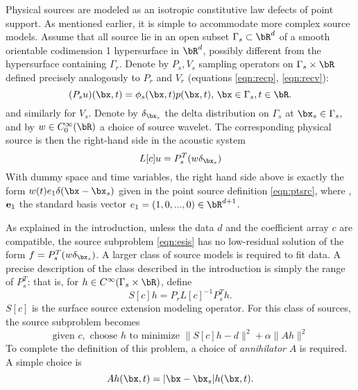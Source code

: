 Physical sources are modeled as an isotropic constitutive law defects of point support. As mentioned earlier, it is simple to accommodate more complex source models. Assume that all source lie in an open subset $\Gamma_s \subset \bR^d$ of a smooth orientable codimension 1 hypersurface in $\bR^d$, possibly different from the hypersurface containing $\Gamma_r$. Denote by $P_s, V_s$ sampling operators on $\Gamma_s \times \bR$ defined precisely analogously to $P_r$ and $V_r$ (equations \ref{eqn:recp}, \ref{eqn:recv}):
\begin{equation}
\label{eqn:recp}
(P_su)(\bx,t) = \phi_s(\bx,t)p(\bx,t),\,\bx \in \Gamma_s, t \in \bR. 
\end{equation}
and similarly for $V_s$. Denote by $\delta_{\bx_s}$ the delta distribution on $\Gamma_s$ at $\bx_s \in \Gamma_s$, and by $w \in C_0^{\infty}(\bR)$ a choice of source wavelet. The corresponding physical source is then the right-hand side in the acoustic system
\begin{equation}
\label{eqn:awe-src}
L[c]u = P_s^T(w\delta_{\bx_s}) 
\end{equation}
With dummy space and time variables, the right hand side above is exactly the form $w(t)e_1\delta(\bx-\bx_s)$ given in the point source definition \ref{eqn:ptsrc}, where , ${\bf e}_1$ the standard basis vector $e_1=(1,0,...,0) \in \bR^{d+1}$.

As explained in the introduction, unless the data $d$ and the coefficient array $c$ are compatible, the source subproblem \ref{eqn:esis} has no low-residual solution of the form $f = P_s^T(w\delta_{\bx_s}) $. A larger class of source models is required to fit data. A precise description of the class described in the introduction is simply the range of $P_s^T$: that is, for $h \in C^{\infty}(\Gamma_s \times \bR)$, define
\begin{equation}
S[c]h = P_rL[c]^{-1}P_s^T h.
\end{equation}
$S[c]$ is the surface source extension modeling operator. For this class of sources, the source subproblem becomes 
\begin{equation}
\label{eqn:esis-sse}
\mbox{given } c, \mbox{ choose } h  \mbox{ to minimize } \|S[c]h -d \|^2 + \alpha \|Ah\|^2 
\end{equation}
To complete the definition of this problem, a choice of {\em annihilator} $A$ is required. A simple choice is
\begin{equation}
\label{eqn:msste}
Ah(\bx,t) = |\bx-\bx_s|h(\bx,t). 
\end{equation} 

